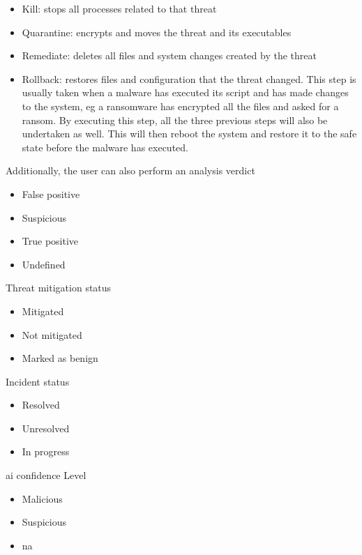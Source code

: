 \begin{multicols}{2}
      \begin{itemize}
            \item Kill: stops all processes related to that threat
            \item Quarantine: encrypts and moves the threat and its executables
            \item Remediate: deletes all files and system changes created by the threat
            \item Rollback: restores files and configuration that the threat changed. This step is usually taken when a malware has
                  executed its script and has made changes to the system, \acrshort{eg} a ransomware has encrypted all the files and
                  asked for a ransom. By executing this step, all the three previous steps will also be undertaken as well. This will
                  then reboot the system and restore it to the safe state before the malware has executed.
      \end{itemize}

      Additionally, the user can also perform an analysis verdict
      \begin{itemize}
            \item False positive
            \item Suspicious
            \item True positive
            \item Undefined
      \end{itemize}

      Threat mitigation status
      \begin{itemize}
            \item Mitigated
            \item Not mitigated
            \item Marked as benign
      \end{itemize}

      Incident status
      \begin{itemize}
            \item Resolved
            \item Unresolved
            \item In progress
      \end{itemize}

      \acrshort{ai} confidence Level
      \begin{itemize}
            \item Malicious
            \item Suspicious
            \item \acrshort{na}
      \end{itemize}


\end{multicols}
